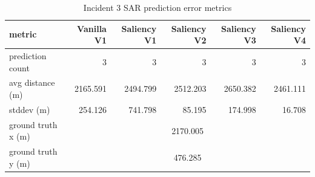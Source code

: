 \begin{table}[ht]
\centering
\caption{Incident 3 SAR prediction error metrics}
\label{tab:sar-incident-3}
\begin{tabular}{lrrrrr}
\hline
metric & Vanilla V1 & Saliency V1 & Saliency V2 & Saliency V3 & Saliency V4 \\
\hline
prediction count & 3 & 3 & 3 & 3 & 3 \\
avg distance (m) & 2165.591 & 2494.799 & 2512.203 & 2650.382 & 2461.111 \\
stddev (m) & 254.126 & 741.798 & 85.195 & 174.998 & 16.708 \\
ground truth x (m) & \multicolumn{5}{c}{2170.005} \\
ground truth y (m) & \multicolumn{5}{c}{476.285} \\
\hline
\end{tabular}
\end{table}
